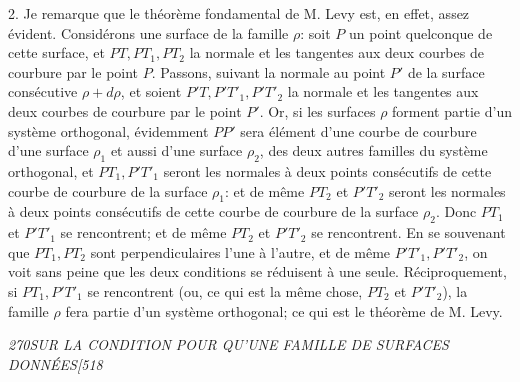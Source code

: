 \documentclass[11pt]{article}
\newcommand{\phead}[3]{\noindent\textit{#1\hfill #2\hfill #3}\par\medskip}
\begin{document}
2. Je remarque que le th\'eor\`eme fondamental de M. Levy est, en effet, assez \'evident.
Consid\'erons une surface de la famille $\rho$: soit $P$ un point quelconque de cette
surface, et $PT,PT_1,PT_2$ la normale et les tangentes aux deux courbes de courbure
par le point $P$. Passons, suivant la normale au point $P'$ de la surface cons\'ecutive
$\rho+d\rho$, et soient $P'T,P'T'_1,P'T'_2$ la normale et les tangentes aux deux courbes
de courbure par le point $P'$. Or, si les surfaces $\rho$ forment partie d'un syst\`eme
orthogonal, \'evidemment $PP'$ sera \'el\'ement d'une courbe de courbure d'une surface
$\rho_1$ et aussi d'une surface $\rho_2$, des deux autres familles du syst\`eme orthogonal,
et $PT_1,P'T'_1$ seront les normales \`a deux points cons\'ecutifs de cette courbe de
courbure de la surface $\rho_1$: et de m\^eme $PT_2$ et $P'T'_2$ seront les normales \`a
deux points cons\'ecutifs de cette courbe de courbure de la surface $\rho_2$. Donc $PT_1$
et $P'T'_1$ se rencontrent; et de m\^eme $PT_2$ et $P'T'_2$ se rencontrent. En se souvenant
que $PT_1,PT_2$ sont perpendiculaires l'une \`a l'autre, et de m\^eme $P'T'_1,P'T'_2$,
on voit sans peine que les deux conditions se r\'eduisent \`a une seule. R\'eciproquement,
si $PT_1,P'T'_1$ se rencontrent (ou, ce qui est la m\^eme chose, $PT_2$ et $P'T'_2$), la
famille $\rho$ fera partie d'un syst\`eme orthogonal; ce qui est le th\'eor\`eme de M. Levy.

\clearpage

\phead{270}{SUR LA CONDITION POUR QU'UNE FAMILLE DE SURFACES DONN\'EES}{[518}
\end{document}

